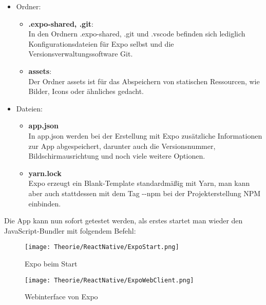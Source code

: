 \begin{itemize}
\item Ordner:
  \begin{itemize}
  \item \textbf{.expo-shared, .git}:\\
  In den Ordnern .expo-shared, .git und .vscode befinden sich lediglich Konfigurationsdateien für
  Expo selbst und die Versionsverwaltungssoftware Git.

  \item \textbf{assets}:\\
  Der Ordner assets ist für das Abspeichern von statischen Ressourcen, wie Bilder, Icons oder
  ähnliches gedacht.
  \end{itemize}

\newpage

\item Dateien:
  \begin{itemize}
  \item \textbf{app.json}\\
  In app.json werden bei der Erstellung mit Expo zusätzliche Informationen zur App abgespeichert,
  darunter auch die Versionsnummer, Bildschirmausrichtung und noch viele weitere Optionen.

  \item \textbf{yarn.lock}\\
  Expo erzeugt ein Blank-Template standardmäßig mit Yarn, man kann aber auch stattdessen mit dem
  Tag -{}-npm bei der Projekterstellung NPM einbinden.
  \end{itemize}
\end{itemize}

Die App kann nun sofort getestet werden, als erstes startet man wieder den JavaScript-Bundler
 mit folgendem Befehl:

\begin{figure}[H]
  \begin{center}
    \texttt{[image: Theorie/ReactNative/ExpoStart.png]}
    \caption{Expo beim Start}
  \end{center}
\end{figure}

\begin{figure}[H]
  \begin{center}
    \texttt{[image: Theorie/ReactNative/ExpoWebClient.png]}
    \caption{Webinterface von Expo}
  \end{center}
\end{figure}

